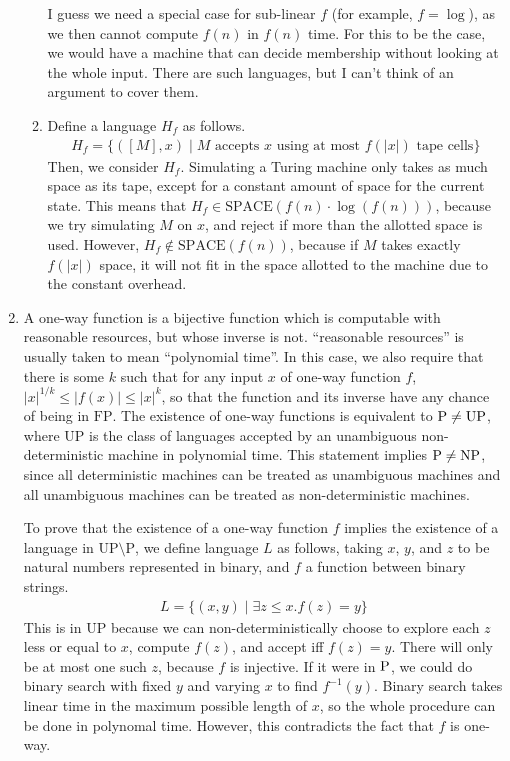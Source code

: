\documentclass{article}
\begin{document}
\begin{enumerate}
\begin{enumerate}[label=\arabic{enumii}.]
        I guess we need a special case for sub-linear $f$ (for example, $f = \log$), as we then cannot compute $f(n)$ in $f(n)$ time. For this to be the case, we would have a machine that can decide membership without looking at the whole input. There are such languages, but I can't think of an argument to cover them.
      \item
        Define a language $H_f$ as follows.
        \begin{align*}
          H_f = \{ ([M], x) \mid M\textrm{ accepts }x\textrm{ using at most }f(\lvert x \rvert)\textrm{ tape cells} \}
        \end{align*}
        Then, we consider $H_f$. Simulating a Turing machine only takes as much space as its tape, except for a constant amount of space for the current state. This means that $H_f \in \textrm{SPACE}(f(n) \cdot \log(f(n)))$, because we try simulating $M$ on $x$, and reject if more than the allotted space is used. However, $H_f \notin \textrm{SPACE}(f(n))$, because if $M$ takes exactly $f(\lvert x \rvert)$ space, it will not fit in the space allotted to the machine due to the constant overhead.
    \end{enumerate}
  \item A one-way function is a bijective function which is computable with reasonable resources, but whose inverse is not. ``reasonable resources'' is usually taken to mean ``polynomial time''. In this case, we also require that there is some $k$ such that for any input $x$ of one-way function $f$, $\lvert x \rvert^{1/k} \leq \lvert f(x) \rvert \leq \lvert x \rvert^k$, so that the function and its inverse have any chance of being in $\textrm{FP}$. The existence of one-way functions is equivalent to $\textrm P \neq \textrm{UP}$, where $\textrm{UP}$ is the class of languages accepted by an unambiguous non-deterministic machine in polynomial time. This statement implies $\textrm P \neq \textrm{NP}$, since all deterministic machines can be treated as unambiguous machines and all unambiguous machines can be treated as non-deterministic machines.

    To prove that the existence of a one-way function $f$ implies the existence of a language in $\textrm{UP} \setminus \textrm{P}$, we define language $L$ as follows, taking $x$, $y$, and $z$ to be natural numbers represented in binary, and $f$ a function between binary strings.
    \begin{align*}
      L = \{ (x,y) \mid \exists z \leq x. f(z) = y \}
    \end{align*}
    This is in $\textrm{UP}$ because we can non-deterministically choose to explore each $z$ less or equal to $x$, compute $f(z)$, and accept iff $f(z) = y$. There will only be at most one such $z$, because $f$ is injective. If it were in $\textrm P$, we could do binary search with fixed $y$ and varying $x$ to find $f^{-1}(y)$. Binary search takes linear time in the maximum possible length of $x$, so the whole procedure can be done in polynomal time. However, this contradicts the fact that $f$ is one-way.


\end{enumerate}
\end{document}
